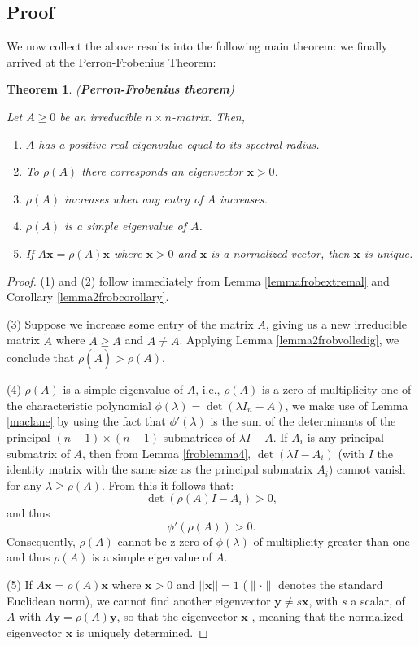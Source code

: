 \documentclass[a4paper,11pt]{report}
\newtheorem{theorem}{Theorem}[section]
\begin{document}
\subsection{Proof}
We now collect the above results into the following main theorem: we finally 
arrived at the Perron-Frobenius Theorem:
\begin{theorem}(\textbf{Perron-Frobenius theorem})\label{frobtheorem}

  Let $A \geq 0$ be an irreducible $n\times n$-matrix. Then,
  \begin{enumerate}
    \item $A$ has a positive real eigenvalue equal to its spectral radius.
    \item To $\rho(A)$ there corresponds an eigenvector $\mathbf{x} > 0$.
    \item $\rho(A)$ increases when any entry of $A$ increases.
    \item $\rho(A)$ is a simple eigenvalue of $A$.
    \item If $A\mathbf{x} = \rho(A)\mathbf{x}$ where $\mathbf{x} > 0$ and $\mathbf{x}$ 
    is a normalized vector, then $\mathbf{x}$ is unique.
    
  \end{enumerate}
  \end{theorem}
 \begin{proof}
  (1) and (2) follow immediately from Lemma \ref{lemmafrobextremal} and 
   Corollary \ref{lemma2frobcorollary}. 
   
  (3) Suppose we increase 
   some entry of the matrix $A$, giving us a new irreducible matrix $\tilde{A}$ 
   where $\tilde{A} \geq A$ and  $\tilde{A} \not = A$. Applying Lemma 
   \ref{lemma2frobvolledig}, we conclude that $\rho(\tilde{A}) > \rho(A).$ 
   
   (4) $\rho(A)$ is a simple eigenvalue of $A$, i.e., $\rho(A)$ is a zero of multiplicity one of the characteristic polynomial
   $\phi(\lambda) = \det(\lambda I_n - A)$, we make use of Lemma \ref{maclane} by using the fact that $\phi'(\lambda)$ is the sum of the
   determinants of the principal $(n-1)\times(n-1)$ submatrices of $\lambda I - A$. If $A_i$ is any principal submatrix of
   $A$, then from Lemma \ref{froblemma4}, $\det(\lambda I - A_i)$ (with $I$ the identity matrix with the same size as the principal submatrix $A_i$) cannot vanish 
   for any $\lambda \geq \rho(A)$. From this it follows that:
   $$\det(\rho(A)I - A_i) > 0,$$
   and thus
   $$\phi'(\rho(A)) > 0.$$
   Consequently, $\rho(A)$ cannot be z zero of $\phi(\lambda)$ of multiplicity 
   greater than one and thus $\rho(A)$ is a simple eigenvalue of $A$. 
   
  (5) If $A\mathbf{x} = \rho(A)\mathbf{x}$ where $\mathbf{x} > 0$ 
   and $||\mathbf{x}|| = 1$ ($\|\cdot \|$ denotes the standard Euclidean norm), we cannot find 
   another eigenvector $\mathbf{y} \not = s\mathbf{x}$, with $s$ a scalar, of $A$ 
   with $A\mathbf{y} = \rho(A)\mathbf{y}$, so that the eigenvector $\mathbf{x}$ 
   , meaning that the normalized eigenvector $\mathbf{x}$ is uniquely 
   determined.
       \end{proof}
\end{document}
